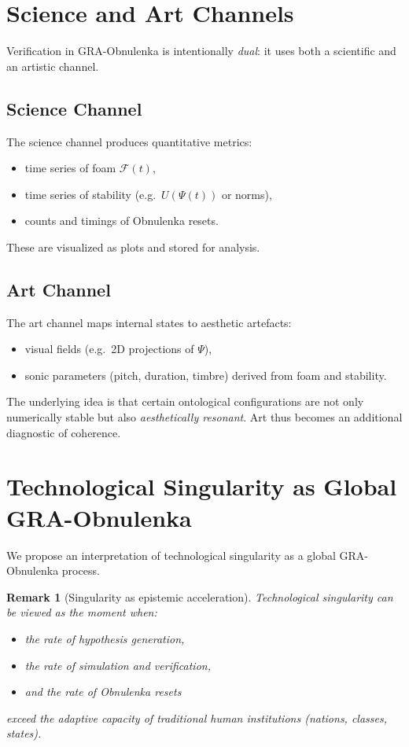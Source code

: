 \documentclass[11pt,a4paper]{article}
\newtheorem{remark}{Remark}
\begin{document}
\section{Science and Art Channels}
Verification in GRA-Obnulenka is intentionally \emph{dual}:
it uses both a scientific and an artistic channel.

\subsection{Science Channel}
The science channel produces quantitative metrics:
\begin{itemize}
  \item time series of foam $\mathcal{F}(t)$,
  \item time series of stability (e.g.\ $U(\Psi(t))$ or norms),
  \item counts and timings of Obnulenka resets.
\end{itemize}
These are visualized as plots and stored for analysis.

\subsection{Art Channel}
The art channel maps internal states to aesthetic artefacts:
\begin{itemize}
  \item visual fields (e.g.\ 2D projections of $\Psi$),
  \item sonic parameters (pitch, duration, timbre) derived from foam and stability.
\end{itemize}
The underlying idea is that certain ontological configurations
are not only numerically stable but also \emph{aesthetically resonant}.
Art thus becomes an additional diagnostic of coherence.

\section{Technological Singularity as Global GRA-Obnulenka}
We propose an interpretation of technological singularity
as a global GRA-Obnulenka process.

\begin{remark}[Singularity as epistemic acceleration]
Technological singularity can be viewed as the moment when:
\begin{itemize}
  \item the rate of hypothesis generation,
  \item the rate of simulation and verification,
  \item and the rate of Obnulenka resets
\end{itemize}
exceed the adaptive capacity of traditional human institutions
(nations, classes, states).
\end{remark}
\end{document}
